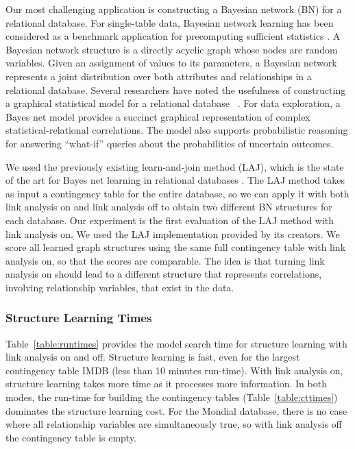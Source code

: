 \documentclass{sig-alternate-2013}
\begin{document}
Our most challenging application is constructing a Bayesian network (BN) for a relational database. For single-table data, Bayesian network learning has been considered as a benchmark application for precomputing sufficient statistics \cite{Moore1998,lv2012}. A Bayesian network structure is a directly acyclic graph whose nodes are random variables. Given an assignment of values to its parameters, a Bayesian network represents a joint distribution over both attributes and relationships in a relational database. Several researchers have noted the usefulness of constructing a graphical statistical model for a relational database ~\cite{Graepel_CIKM13,Wang2008}.
For data exploration, a Bayes net  model provides a succinct graphical representation of complex statistical-relational correlations. The model also supports probabilistic reasoning for answering ``what-if'' queries about the probabilities of uncertain outcomes. 

We used the previously existing learn-and-join method (LAJ), which is the state of the art for Bayes net learning in relational databases \cite{Schulte2012}. The LAJ method takes as input a contingency table for the entire database, so we can apply it with both link analysis on and link analysis off to obtain two different BN structures for each database. Our experiment is the first evaluation of the LAJ method with link analysis on. We used the LAJ implementation provided by its creators.
%
We score all learned graph structures using the same full contingency table with link analysis on, so that the scores are comparable. The idea is that turning link analysis on should lead to a different structure that represents correlations, involving relationship variables, that exist in the data.


\subsubsection{Structure Learning Times} 
Table~\ref{table:runtimes} provides the model search time for structure learning with link analysis on and off. Structure learning is fast, even for the largest contingency table  IMDB (less than 10 minutes run-time). With link analysis on, structure learning takes more time as it processes more information. 
In both modes, the run-time for building the contingency tables (Table~\ref{table:cttimes}) dominates the structure learning cost. For the Mondial database, there is no case where all relationship variables are simultaneously true, so with link analysis off the contingency table is empty.
\end{document}
